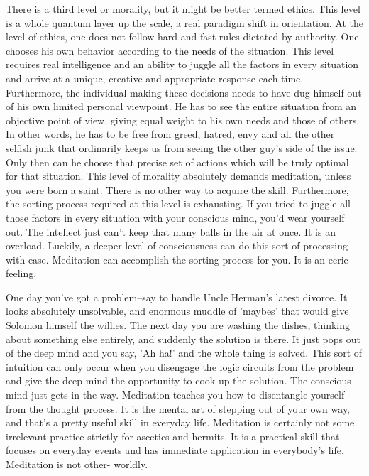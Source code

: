 There is a third level or morality, but it might be better termed ethics. This
level is a whole quantum layer up the scale, a real paradigm shift in
orientation. At the level of ethics, one does not follow hard and fast rules
dictated by authority. One chooses his own behavior according to the needs of
the situation. This level requires real intelligence and an ability to juggle
all the factors in every situation and arrive at a unique, creative and
appropriate response each time. Furthermore, the individual making these
decisions needs to have dug himself out of his own limited personal viewpoint.
He has to see the entire situation from an objective point of view, giving equal
weight to his own needs and those of others. In other words, he has to be free
from greed, hatred, envy and all the other selfish junk that ordinarily keeps us
from seeing the other guy's side of the issue. Only then can he choose that
precise set of actions which will be truly optimal for that situation. This
level of morality absolutely demands meditation, unless you were born a saint.
There is no other way to acquire the skill. Furthermore, the sorting process
required at this level is exhausting. If you tried to juggle all those factors
in every situation with your conscious mind, you'd wear yourself out. The
intellect just can't keep that many balls in the air at once. It is an overload.
Luckily, a deeper level of consciousness can do this sort of processing with
ease. Meditation can accomplish the sorting process for you. It is an eerie
feeling.

One day you've got a problem--say to handle Uncle Herman's latest divorce. It
looks absolutely unsolvable, and enormous muddle of 'maybes' that would give
Solomon himself the willies. The next day you are washing the dishes, thinking
about something else entirely, and suddenly the solution is there. It just pops
out of the deep mind and you say, 'Ah ha!' and the whole thing is solved.
This sort of intuition can only occur when you disengage the logic circuits from
the problem and give the deep mind the opportunity to cook up the solution. The
conscious mind just gets in the way. Meditation teaches you how to disentangle
yourself from the thought process. It is the mental art of stepping out of your
own way, and that's a pretty useful skill in everyday life. Meditation is
certainly not some irrelevant practice strictly for ascetics and hermits. It is
a practical skill that focuses on everyday events and has immediate application
in everybody's life. Meditation is not other- worldly.


